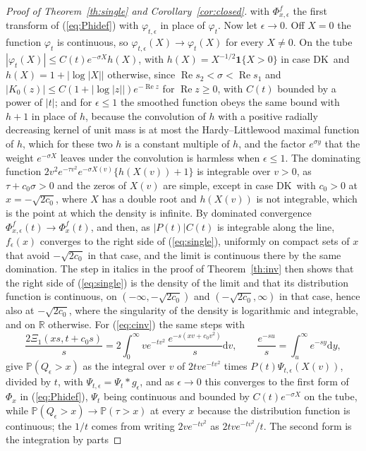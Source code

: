 \documentclass[ecta,nameyear,final]{econsocart}
\newcommand{\PP}{{\mathbb P}}
\newcommand{\dr}[1]{{\mathrm d}#1}
\newcommand{\Rea}{\operatorname{Re}}
\newcommand{\Fk}{\textsf{\upshape DK}}
\theoremstyle{plain}
\theoremstyle{definition}
\begin{document}
\begin{appendix}
\begin{proof}[Proof of Theorem~\ref{th:single} and Corollary~\ref{cor:closed}]
with $\Phi^f_{x,\epsilon}$ the first transform of (\ref{eq:Phidef}) with $\varphi_{t,\epsilon}$ in place of $\varphi_t$.  Now let $\epsilon\to0$.  Off $X=0$ the function $\varphi_t$ is continuous, so $\varphi_{t,\epsilon}(X)\to\varphi_t(X)$ for every $X\ne0$.  On the tube $|\varphi_t(X)|\le C(t)e^{-\sigma X}h(X)$, with $h(X)=X^{-1/2}\mathbf{1}\{X>0\}$ in case \Fk\ and $h(X)=1+|\log|X||$ otherwise, since $\Rea s_2<\sigma<\Rea s_1$ and $|K_0(z)|\le C(1+|\log|z||)e^{-\Rea z}$ for $\Rea z\ge0$, with $C(t)$ bounded by a power of $|t|$; and for $\epsilon\le1$ the smoothed function obeys the same bound with $h+1$ in place of $h$, because the convolution of $h$ with a positive radially decreasing kernel of unit mass is at most the Hardy--Littlewood maximal function of $h$, which for these two $h$ is a constant multiple of $h$, and the factor $e^{\sigma y}$ that the weight $e^{-\sigma X}$ leaves under the convolution is harmless when $\epsilon\le1$.  The dominating function $2v^2e^{-\tau v^2}e^{-\sigma X(v)}\{h(X(v))+1\}$ is integrable over $v>0$, as $\tau+c_0\sigma>0$ and the zeros of $X(v)$ are simple, except in case \Fk\ with $c_0>0$ at $x=-\sqrt{2c_0}$, where $X$ has a double root and $h(X(v))$ is not integrable, which is the point at which the density is infinite.  By dominated convergence $\Phi^f_{x,\epsilon}(t)\to\Phi^f_x(t)$, and then, as $|P(t)|C(t)$ is integrable along the line, $f_\epsilon(x)$ converges to the right side of (\ref{eq:single}), uniformly on compact sets of $x$ that avoid $-\sqrt{2c_0}$ in that case, and the limit is continuous there by the same domination.  The step in italics in the proof of Theorem~\ref{th:inv} then shows that the right side of (\ref{eq:single}) is the density of the limit and that its distribution function is continuous, on $(-\infty,-\sqrt{2c_0})$ and $(-\sqrt{2c_0},\infty)$ in that case, hence also at $-\sqrt{2c_0}$, where the singularity of the density is logarithmic and integrable, and on $\mathbb{R}$ otherwise.  For (\ref{eq:cinv}) the same steps with
\[
\frac{2\Xi_1(xs,t+c_0s)}{s}=2\int_0^\infty ve^{-tv^2}\,\frac{e^{-s(xv+c_0v^2)}}{s}\dr{v},\qquad
\frac{e^{-su}}{s}=\int_u^\infty e^{-sy}\dr{y},
\]
give $\PP(Q_\epsilon>x)$ as the integral over $v$ of $2tve^{-tv^2}$ times $P(t)\Psi_{t,\epsilon}(X(v))$, divided by $t$, with $\Psi_{t,\epsilon}=\Psi_t*g_\epsilon$, and as $\epsilon\to0$ this converges to the first form of $\Phi_x$ in (\ref{eq:Phidef}), $\Psi_t$ being continuous and bounded by $C(t)e^{-\sigma X}$ on the tube, while $\PP(Q_\epsilon>x)\to\PP(\tau>x)$ at every $x$ because the distribution function is continuous; the $1/t$ comes from writing $2ve^{-tv^2}$ as $2tve^{-tv^2}/t$.  The second form is the integration by parts

\end{proof}
\end{appendix}
\end{document}
